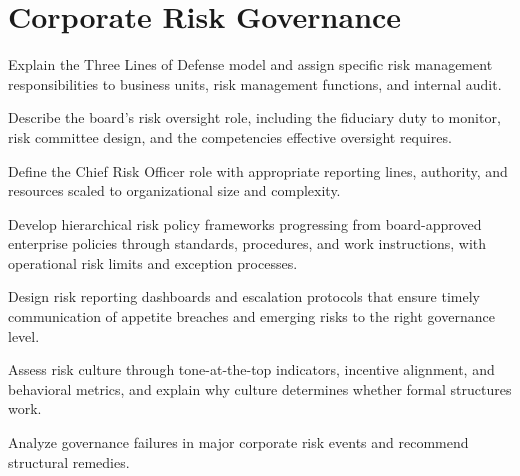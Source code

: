 \documentclass[11pt,openany]{book}
\begin{document}
\setcounter{chapter}{8}
\chapter{Corporate Risk Governance}
\label{chap:governance}

\begin{learningobjectives}
  \item Explain the Three Lines of Defense model and assign specific risk
        management responsibilities to business units, risk management
        functions, and internal audit.
  \item Describe the board's risk oversight role, including the fiduciary
        duty to monitor, risk committee design, and the competencies
        effective oversight requires.
  \item Define the Chief Risk Officer role with appropriate reporting lines,
        authority, and resources scaled to organizational size and
        complexity.
  \item Develop hierarchical risk policy frameworks progressing from
        board-approved enterprise policies through standards, procedures,
        and work instructions, with operational risk limits and exception
        processes.
  \item Design risk reporting dashboards and escalation protocols that
        ensure timely communication of appetite breaches and emerging risks
        to the right governance level.
  \item Assess risk culture through tone-at-the-top indicators, incentive
        alignment, and behavioral metrics, and explain why culture
        determines whether formal structures work.
  \item Analyze governance failures in major corporate risk events and
        recommend structural remedies.
\end{learningobjectives}
\end{document}

